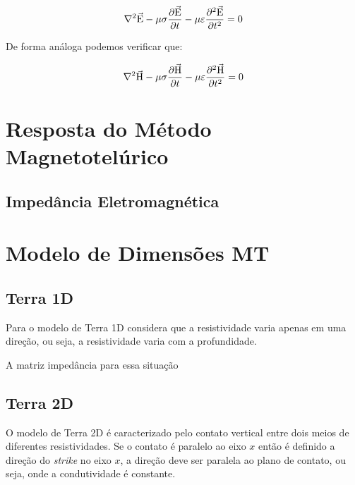             \begin{equation}
             \nabla^2 \vec{\textrm{E}} - \mu \sigma \dfrac{\partial \vec{\textrm{E}}}{\partial t} - \mu \varepsilon \dfrac{\partial^2 \vec{\textrm{E}}}{\partial t^2} = 0
            \end{equation}
            
            De forma análoga podemos verificar que:
            
            \begin{equation}
             \nabla^2 \vec{\textrm{H}} - \mu \sigma \dfrac{\partial \vec{\textrm{H}}}{\partial t} - \mu \varepsilon \dfrac{\partial^2 \vec{\textrm{H}}}{\partial t^2} = 0
            \end{equation}

 
    
    
    
    \section{Resposta do Método Magnetotelúrico}
        \subsection{Impedância Eletromagnética}
        
        
        
    
    
    
    \section{Modelo de Dimensões MT}
        \subsection{Terra 1D}
        
        Para o modelo de Terra 1D considera que a resistividade varia apenas em uma direção, ou seja, a resistividade varia com a profundidade.
        
        A matriz impedância para essa situação 
        \subsection{Terra 2D}
        
        O modelo de Terra 2D é caracterizado pelo contato vertical entre dois meios de diferentes resistividades. Se o contato é
	    paralelo ao eixo $x$ então é definido a direção do \textit{strike} no eixo $x$, a direção deve ser paralela ao plano de contato,
	    ou seja, onde a condutividade é constante.%
	    
